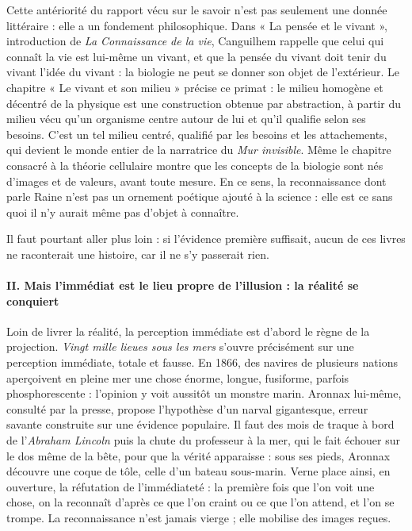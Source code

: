 \documentclass[11pt,a4paper]{article}
\begin{document}
Cette antériorité du rapport vécu sur le savoir n'est pas seulement une donnée littéraire : elle a un fondement philosophique. Dans « La pensée et le vivant », introduction de \emph{La Connaissance de la vie}, Canguilhem rappelle que celui qui connaît la vie est lui-même un vivant, et que la pensée du vivant doit tenir du vivant l'idée du vivant : la biologie ne peut se donner son objet de l'extérieur. Le chapitre « Le vivant et son milieu » précise ce primat : le milieu homogène et décentré de la physique est une construction obtenue par abstraction, à partir du milieu vécu qu'un organisme centre autour de lui et qu'il qualifie selon ses besoins. C'est un tel milieu centré, qualifié par les besoins et les attachements, qui devient le monde entier de la narratrice du \emph{Mur invisible}. Même le chapitre consacré à la théorie cellulaire montre que les concepts de la biologie sont nés d'images et de valeurs, avant toute mesure. En ce sens, la reconnaissance dont parle Raine n'est pas un ornement poétique ajouté à la science : elle est ce sans quoi il n'y aurait même pas d'objet à connaître.

Il faut pourtant aller plus loin : si l'évidence première suffisait, aucun de ces livres ne raconterait une histoire, car il ne s'y passerait rien.

\hypertarget{ii.-mais-limmuxe9diat-est-le-lieu-propre-de-lillusion-la-ruxe9alituxe9-se-conquiert}{%
\paragraph{II. Mais l'immédiat est le lieu propre de l'illusion : la réalité se conquiert}\label{ii.-mais-limmuxe9diat-est-le-lieu-propre-de-lillusion-la-ruxe9alituxe9-se-conquiert}}

Loin de livrer la réalité, la perception immédiate est d'abord le règne de la projection. \emph{Vingt mille lieues sous les mers} s'ouvre précisément sur une perception immédiate, totale et fausse. En 1866, des navires de plusieurs nations aperçoivent en pleine mer une chose énorme, longue, fusiforme, parfois phosphorescente : l'opinion y voit aussitôt un monstre marin. Aronnax lui-même, consulté par la presse, propose l'hypothèse d'un narval gigantesque, erreur savante construite sur une évidence populaire. Il faut des mois de traque à bord de l'\emph{Abraham Lincoln} puis la chute du professeur à la mer, qui le fait échouer sur le dos même de la bête, pour que la vérité apparaisse : sous ses pieds, Aronnax découvre une coque de tôle, celle d'un bateau sous-marin. Verne place ainsi, en ouverture, la réfutation de l'immédiateté : la première fois que l'on voit une chose, on la reconnaît d'après ce que l'on craint ou ce que l'on attend, et l'on se trompe. La reconnaissance n'est jamais vierge ; elle mobilise des images reçues.
\end{document}
